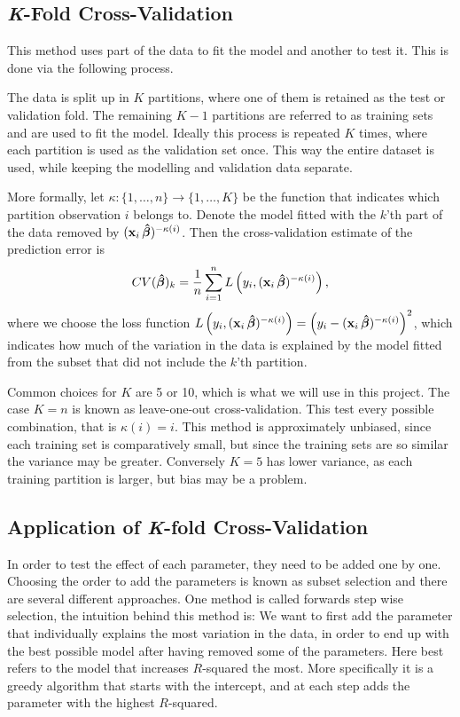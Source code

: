 \subsection{\textit{K}-Fold Cross-Validation}

This method uses part of the data to fit the model and another to test it. This is done via the following process.

The data is split up in $K$ partitions, where one of them is retained as the test or validation fold. 
The remaining $K-1$ partitions are referred to as training sets and are used to fit the model.
Ideally this process is repeated $K$ times, where each partition is used as the validation set once. 
This way the entire dataset is used, while keeping the modelling and validation data separate. 

More formally, let $\kappa: \{1, \ldots, n\} \rightarrow \{1, \ldots, K\}$ be the function that indicates which partition observation $i$ belongs to. 
Denote the model fitted with the $k$'th part of the data removed by $(\textbf{x}_i \operatorname{\boldsymbol{\hat{\beta}}})^{-\kappa(i)}$. 
Then the cross-validation estimate of the prediction error is 
\begin{align*}
    CV(\operatorname{\boldsymbol{\hat{\beta}}})_k = \frac{1}{n} \sum_{i=1}^n L\left(y_i, (\textbf{x}_i \operatorname{\boldsymbol{\hat{\beta}}})^{-\kappa(i)}\right),
\end{align*}
where we choose the loss function $L\left(y_i, (\textbf{x}_i \operatorname{\boldsymbol{\hat{\beta}}})^{-\kappa(i)}\right)=\left(y_i - (\textbf{x}_i \operatorname{\boldsymbol{\hat{\beta}}})^{-\kappa(i)}\right)^2$, which indicates how much of the variation in the data is explained by the model fitted from the subset that did not include the $k$'th partition. 

Common choices for $K$ are 5 or 10, which is what we will use in this project. 
The case $K = n$ is known as leave-one-out cross-validation. 
This test every possible combination, that is $\kappa(i) = i$. 
This method is approximately unbiased, since each training set is comparatively small, but since the training sets are so similar the variance may be greater. 
Conversely $K=5$ has lower variance, as each training partition is larger, but bias may be a problem. 


\subsection{Application of \textit{K}-fold Cross-Validation}
In order to test the effect of each parameter, they need to be added one by one. 
Choosing the order to add the parameters is known as subset selection and there are several different approaches.
One method is called forwards step wise selection, the intuition behind this method is:
We want to first add the parameter that individually explains the most variation in the data, in order to end up with the best possible model after having removed some of the parameters.
Here best refers to the model that increases $R$-squared the most.
More specifically it is a greedy algorithm that starts with the intercept, and at each step adds the parameter with the highest $R$-squared.

